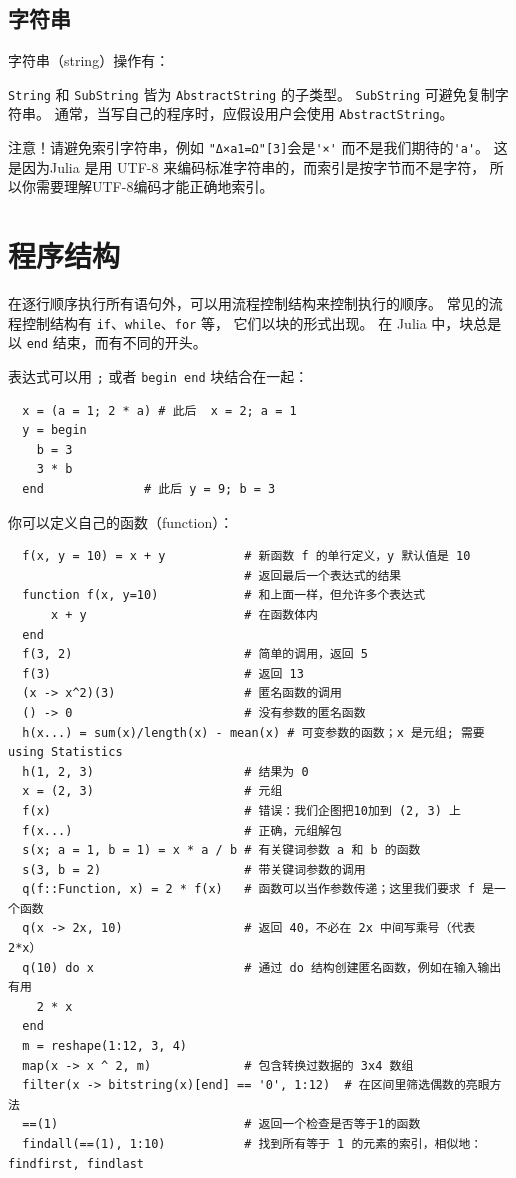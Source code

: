 \documentclass[10pt,a4paper]{article}
\begin{document}
\subsection{字符串}
字符串（string）操作有：


\lstinline|String| 和 \lstinline|SubString| 皆为 \lstinline|AbstractString| 的子类型。
\lstinline|SubString| 可避免复制字符串。
通常，当写自己的程序时，应假设用户会使用 \lstinline|AbstractString|。

注意！请避免索引字符串，例如 \lstinline|"Δ×a1=Ω"[3]|会是\lstinline|'×'| 而不是我们期待的\lstinline|'a'|。
这是因为Julia 是用 UTF-8 来编码标准字符串的，而索引是按字节而不是字符，
所以你需要理解UTF-8编码才能正确地索引。


\section{程序结构}

在逐行顺序执行所有语句外，可以用流程控制结构来控制执行的顺序。
常见的流程控制结构有 \lstinline|if|、\lstinline|while|、\lstinline|for| 等，
它们以块的形式出现。
在 Julia 中，块总是以 \lstinline|end| 结束，而有不同的开头。


表达式可以用 \lstinline|;| 或者 \lstinline|begin end| 块结合在一起：
\begin{lstlisting}
  x = (a = 1; 2 * a) # 此后  x = 2; a = 1
  y = begin
    b = 3
    3 * b
  end              # 此后 y = 9; b = 3
\end{lstlisting}


你可以定义自己的函数（function）：
\label{sec:function}
\begin{lstlisting}
  f(x, y = 10) = x + y           # 新函数 f 的单行定义，y 默认值是 10
                                 # 返回最后一个表达式的结果
  function f(x, y=10)            # 和上面一样，但允许多个表达式
      x + y                      # 在函数体内
  end
  f(3, 2)                        # 简单的调用，返回 5
  f(3)                           # 返回 13
  (x -> x^2)(3)                  # 匿名函数的调用
  () -> 0                        # 没有参数的匿名函数
  h(x...) = sum(x)/length(x) - mean(x) # 可变参数的函数；x 是元组; 需要 using Statistics
  h(1, 2, 3)                     # 结果为 0
  x = (2, 3)                     # 元组
  f(x)                           # 错误：我们企图把10加到 (2, 3) 上
  f(x...)                        # 正确，元组解包
  s(x; a = 1, b = 1) = x * a / b # 有关键词参数 a 和 b 的函数
  s(3, b = 2)                    # 带关键词参数的调用
  q(f::Function, x) = 2 * f(x)   # 函数可以当作参数传递；这里我们要求 f 是一个函数
  q(x -> 2x, 10)                 # 返回 40，不必在 2x 中间写乘号（代表 2*x）
  q(10) do x                     # 通过 do 结构创建匿名函数，例如在输入输出有用
    2 * x
  end
  m = reshape(1:12, 3, 4)
  map(x -> x ^ 2, m)             # 包含转换过数据的 3x4 数组
  filter(x -> bitstring(x)[end] == '0', 1:12)  # 在区间里筛选偶数的亮眼方法
  ==(1)                          # 返回一个检查是否等于1的函数
  findall(==(1), 1:10)           # 找到所有等于 1 的元素的索引，相似地：findfirst, findlast
\end{lstlisting}
\end{document}
